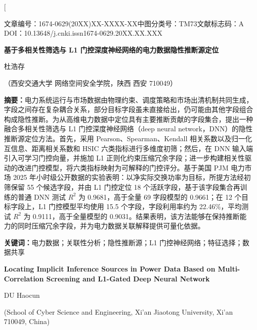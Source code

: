 \documentclass[UTF8,zihao=5,twoside]{ctexart}
\numberwithin{equation}{section}
\newcommand{\articleinfo}{文章编号：1674-0629(20XX)XX-XXXX-XX\quad 中图分类号：TM73\quad 文献标志码：A\\
DOI：10.13648/j.cnki.issn1674-0629.20XX.XX.XXX}
\begin{document}
\twocolumn[

\begin{center}
{\articleinfo}\par\vspace{1.0em}
{\sffamily{}\bfseries 基于多相关性筛选与 L1 门控深度神经网络的电力数据隐性推断源定位}\par\vspace{0.8em}
{杜浩存}\par\vspace{0.4em}
{（西安交通大学 网络空间安全学院，陕西 西安 710049）}\par\vspace{0.8em}
\end{center}

\noindent\textbf{摘要：}电力系统运行与市场数据由物理约束、调度策略和市场出清机制共同生成，字段之间存在复杂耦合关系，部分目标字段虽未直接给出，仍可能由其他字段组合构成隐性推断。为从高维电力数据中定位具有主要推断贡献的字段集合，提出一种融合多相关性筛选与 L1 门控深度神经网络（deep neural network，DNN）的隐性推断源定位方法。首先，采用 Pearson、Spearman、Kendall 相关系数以及归一化互信息、距离相关系数和 HSIC 六类指标进行多维度初筛；然后，在 DNN 输入端引入可学习门控向量，并施加 L1 正则化约束压缩冗余字段；进一步构建相关性驱动的改进门控模型，将六类指标映射为可解释的门控评分。基于美国 PJM 电力市场 2025 年小时级公开数据的实验表明：以净实际交换功率为目标，所提方法经初筛保留 55 个候选字段，并由 L1 门控定位 18 个活跃字段，基于该字段集合再训练的普通 DNN 测试 $R^2$ 为 0.9681，高于全量 69 字段模型的 0.9661；在 12 个目标字段上，L1 门控模型平均使用 15.5 个字段，字段利用率约为 22.46\%，平均测试 $R^2$ 为 0.9111，高于全量模型的 0.9031。结果表明，该方法能够在保持推断能力的同时压缩冗余字段，并为电力数据关联解释提供可量化依据。\par
\noindent\textbf{关键词：}电力数据；关联性分析；隐性推断源；L1 门控神经网络；特征选择；数据共享\par\vspace{0.8em}

\begin{center}
{\bfseries\large Locating Implicit Inference Sources in Power Data Based on Multi-Correlation Screening and L1-Gated Deep Neural Network}\par\vspace{0.5em}
{DU Haocun}\par\vspace{0.3em}
{\small (School of Cyber Science and Engineering, Xi'an Jiaotong University, Xi'an 710049, China)}\par\vspace{0.5em}
\end{center}
\end{document}
